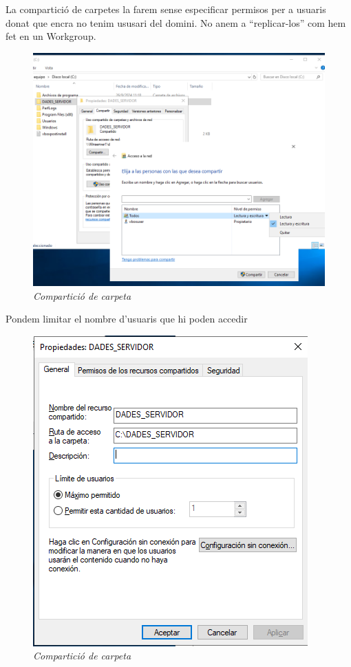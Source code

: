 \documentclass[
  a4paper,
]{article}
\begin{document}
La compartició de carpetes la farem sense especificar permisos per a
usuaris donat que encra no tenim ususari del domini. No anem a
``replicar-los'' com hem fet en un Workgroup.

\begin{figure}
\centering
\includegraphics{png/ADDS/Compartir.png}
\caption{\emph{Compartició de carpeta}}
\end{figure}

Pondem limitar el nombre d'usuaris que hi poden accedir

\begin{figure}
\centering
\includegraphics{png/ADDS/Compartir2.png}
\caption{\emph{Compartició de carpeta}}
\end{figure}
\end{document}
